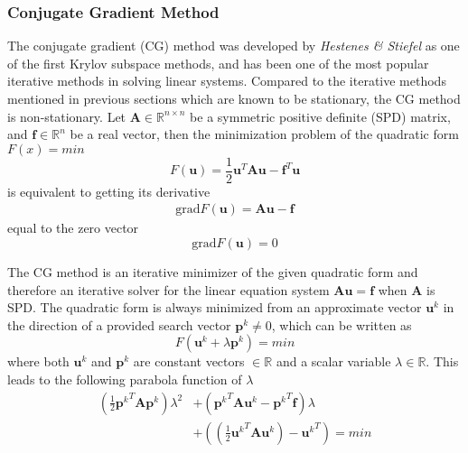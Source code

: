 \subsubsection{Conjugate Gradient Method}
The conjugate gradient (CG) method was developed by \textit{Hestenes \& Stiefel} \citep{hestenes1952methods} as one of the first Krylov subspace methods, and has been one of the most popular iterative methods in solving linear systems. Compared to the iterative methods mentioned in previous sections which are known to be stationary, the CG method is non-stationary. Let $\boldsymbol{A} \in \mathbb{R}^{n\times n}$ be a symmetric positive definite (SPD) matrix, and $\boldsymbol{f} \in \mathbb{R}^n$ be a real vector, then the minimization problem of the quadratic form $F(x) = min$
\begin{equation}
    F(\boldsymbol{u}) = \frac{1}{2}\boldsymbol{u}^T\boldsymbol{A}\boldsymbol{u} - \boldsymbol{f}^T\boldsymbol{u}
\end{equation}
is equivalent to getting its derivative 
\begin{align}
    \text{grad} F(\boldsymbol{u}) = \boldsymbol{Au - f}
\end{align}
equal to the zero vector
\begin{equation}
    \text{grad} F(\boldsymbol{u}) = 0
    \label{eqn:cg_grad}
\end{equation}

The CG method is an iterative minimizer of the given quadratic form and therefore an iterative solver for the linear equation system $\boldsymbol{Au=f}$ when $\boldsymbol{A}$ is SPD. The quadratic form is always minimized from an approximate vector $\boldsymbol{u}^k$ in the direction of a provided search vector $\boldsymbol{p}^k \neq 0$, which can be written as
\begin{equation}
    F(\boldsymbol{u}^k + \lambda\boldsymbol{p}^k) = min
\end{equation}
where both $\boldsymbol{u}^k$ and $\boldsymbol{p}^k$ are constant vectors $\in \mathbb{R}$ and a scalar variable $\lambda \in \mathbb{R}$. This leads to the following parabola function of $\lambda$
\begin{align}
    (\frac{1}{2}{\boldsymbol{p}^{k}}^{T} \boldsymbol{A} \boldsymbol{p}^k) \lambda^2 &+ ({\boldsymbol{p}^{k}}^{T} \boldsymbol{A} \boldsymbol{u}^k - {\boldsymbol{p}^{k}}^T\boldsymbol{f})\lambda \nonumber \\
    &+ ((\frac{1}{2}{\boldsymbol{u}^{k}}^{T} \boldsymbol{A} \boldsymbol{u}^k) - {\boldsymbol{u}^k}^T) = min
\end{align}

